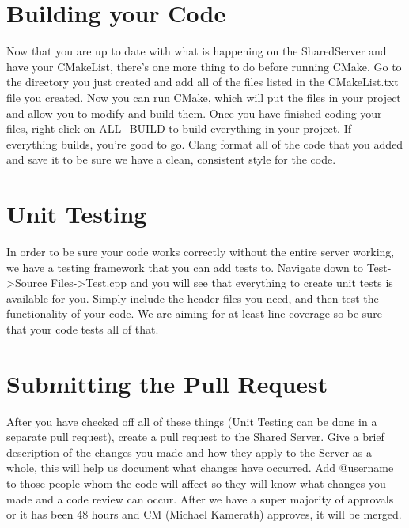 \documentclass{article}
\begin{document}
\section{Building your Code}
Now that you are up to date with what is happening on the SharedServer and have your CMakeList, there's one more thing to do before running CMake. Go to the directory you just created and add all of the files listed in the CMakeList.txt file you created. Now you can run CMake, which will put the files in your project and allow you to modify and build them. Once you have finished coding your files, right click on ALL\_BUILD to build everything in your project. If everything builds, you're good to go. Clang format all of the code that you added and save it to be sure we have a clean, consistent style for the code.

\section{Unit Testing}
In order to be sure your code works correctly without the entire server working, we have a testing framework that you can add tests to. Navigate down to Test->Source Files->Test.cpp and you will see that everything to create unit tests is available for you. Simply include the header files you need, and then test the functionality of your code. We are aiming for at least line coverage so be sure that your code tests all of that.

\section{Submitting the Pull Request}
After you have checked off all of these things (Unit Testing can be done in a separate pull request), create a pull request to the Shared Server. Give a brief description of the changes you made and how they apply to the Server as a whole, this will help us document what changes have occurred. Add @username to those people whom the code will affect so they will know what changes you made and a code review can occur. After we have a super majority of approvals or it has been 48 hours and CM (Michael Kamerath) approves, it will be merged.
\end{document}
